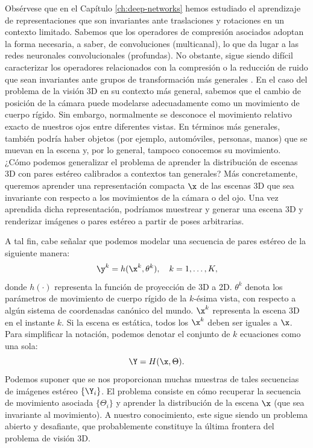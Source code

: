 \documentclass[../../book-main_es.tex]{subfiles}
\begin{document}
Obsérvese que en el Capítulo
\ref{ch:deep-networks} hemos estudiado el aprendizaje de representaciones que son
invariantes ante traslaciones y rotaciones en un contexto limitado. Sabemos que los operadores de compresión
asociados adoptan la forma necesaria, a saber, de convoluciones (multicanal),
lo que da lugar a las redes neuronales convolucionales (profundas).
No obstante, sigue siendo difícil caracterizar los operadores relacionados con la compresión o
la reducción de ruido que sean invariantes ante grupos de transformación más generales
\cite{cohen2016group}.
En el caso del problema de la visión 3D en su contexto más general, sabemos que
el cambio de posición de la cámara puede modelarse adecuadamente como un movimiento de cuerpo rígido.
Sin embargo, normalmente se desconoce el movimiento relativo exacto de nuestros ojos entre diferentes
vistas. En términos más generales, también podría haber
objetos (por ejemplo, automóviles, personas, manos) que se muevan en la escena y,
por lo general, tampoco conocemos su movimiento. ¿Cómo podemos generalizar el
problema de aprender la distribución de escenas 3D con pares estéreo
calibrados a contextos tan generales? Más concretamente, queremos
aprender una representación compacta $\x$ de las escenas 3D que sea
invariante con respecto a los movimientos de la cámara o del ojo. Una vez aprendida dicha representación,
podríamos muestrear y generar una escena 3D y renderizar imágenes o
pares estéreo a partir de poses arbitrarias.

A tal fin, cabe señalar que podemos modelar una secuencia de pares estéreo de la siguiente manera:
\begin{equation}
    \y^k = h(\x^k, \theta^k), \quad k=1, \ldots, K,
\end{equation}
donde $h(\cdot)$ representa la función de proyección de 3D a 2D.
$\theta^k$ denota los parámetros de movimiento de cuerpo rígido de la $k$-ésima
vista, con respecto a algún sistema de coordenadas canónico del mundo. $\x^k$
representa la escena 3D en el instante $k$. Si la escena es estática, todos los 
$\x^k$ deben ser iguales a $\x$. Para simplificar la notación, podemos
denotar el conjunto de $k$ ecuaciones como una sola:
\begin{equation}
    \Y = H(\x,\Theta).
\end{equation}
Podemos suponer que se nos proporcionan muchas muestras de tales secuencias de imágenes estéreo
$\{\Y_i\}$. El problema consiste en cómo recuperar la secuencia de movimiento asociada
$\{\Theta_i\}$ y aprender la distribución de la
escena $\x$ (que sea invariante al movimiento). A nuestro
conocimiento, este sigue siendo un problema abierto y desafiante, que probablemente constituye la
última frontera del problema de visión 3D.
\end{document}
